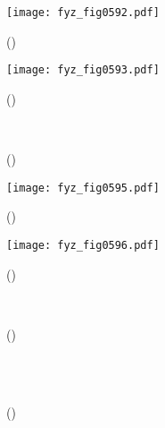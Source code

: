     \begin{figure}[ht!] %
      \centering
      \texttt{[image: fyz\_fig0592.pdf]}
      \caption{
               (\cite[s.~707]{Feynman02})}
      \label{fyz:fig0592}
    \end{figure}

    \begin{figure}[ht!] %
      \centering
      \texttt{[image: fyz\_fig0593.pdf]}
      \caption{
               (\cite[s.~707]{Feynman02})}
      \label{fyz:fig0593}
    \end{figure}

    \begin{figure}[ht!]
      \centering
                     \\
      \caption{
               (\cite[s.~748]{Feynman02})}
    \end{figure}

    \begin{figure}[ht!] %
      \centering
      \texttt{[image: fyz\_fig0595.pdf]}
      \caption{
               (\cite[s.~707]{Feynman02})}
      \label{fyz:fig0595}
    \end{figure}

    \begin{figure}[ht!] %
      \centering
      \texttt{[image: fyz\_fig0596.pdf]}
      \caption{
               (\cite[s.~707]{Feynman02})}
      \label{fyz:fig0596}
    \end{figure}

    \begin{figure}[ht!]
      \centering
                     \\
      \caption{
               (\cite[s.~748]{Feynman02})}
      \label{fyz:fig0597}
    \end{figure}

    \begin{figure}[ht!]
      \centering
                     \\
                     \\
      \caption{
               (\cite[s.~748]{Feynman02})}
      \label{fyz:fig0598}
    \end{figure}

